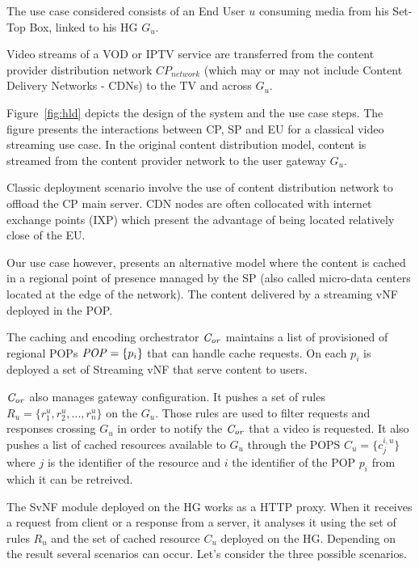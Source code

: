 The use case considered consists of an End User $u$ consuming media from his Set-Top Box, linked to his HG $G_{u}$.

Video streams of a VOD or IPTV service are transferred from the content provider distribution network \(\mathit{CP}_{\mathit{network}}\) (which may or may not include Content Delivery Networks - CDNs) to the TV and across $G_{u}$.

Figure~\ref{fig:hld} depicts the design of the system and the use case steps. The figure presents the interactions between CP, SP and EU for a classical video streaming use case.
In the original content distribution model, content is streamed from the content provider network  to the user gateway \(G_{u}\).

Classic deployment scenario involve the use of content distribution network to offload the CP main server.
CDN nodes are often collocated with internet exchange points (IXP) which present the advantage of being located relatively close of the EU.

Our use case however, presents an alternative model where the content is cached in a regional point of presence managed by the SP (also called micro-data centers located at the edge of the network). The content delivered by a streaming vNF deployed in the POP.

The caching and encoding orchestrator  $\mathit{C_{or}}$ maintains a list of provisioned of regional POPs \(\mathit{POP}=\{p_{i}\}\) that can handle cache requests. On each $p_{i}$ is deployed a set of Streaming vNF that serve content to users.

$\mathit{C_{or}}$ also manages gateway configuration. It pushes a set of rules \(R_{u}=\{r^{u}_{1},r^{u}_{2},...,r^{u}_{n}\}\) on the $G_{u}$. 
Those rules are used to filter requests and responses crossing $G_{u}$ in order to notify the $\mathit{C_{or}}$ that a video is requested.
It also pushes a list of cached resources available to $G_{u}$ through the POPS $C_{u}=\{c^{i,u}_{j} \}$ where $j$ is the identifier of the resource and $i$ the identifier of the POP $p_{i}$ from which it can be retreived.

The SvNF module deployed on the HG works as a HTTP proxy.
When it receives a request from client or a response from a server, it analyses it using the set of rules \(R_{u}\) and the set of cached resource $C_{u}$ deployed on the HG.
Depending on the result several scenarios can occur.
Let's consider the three possible scenarios.


